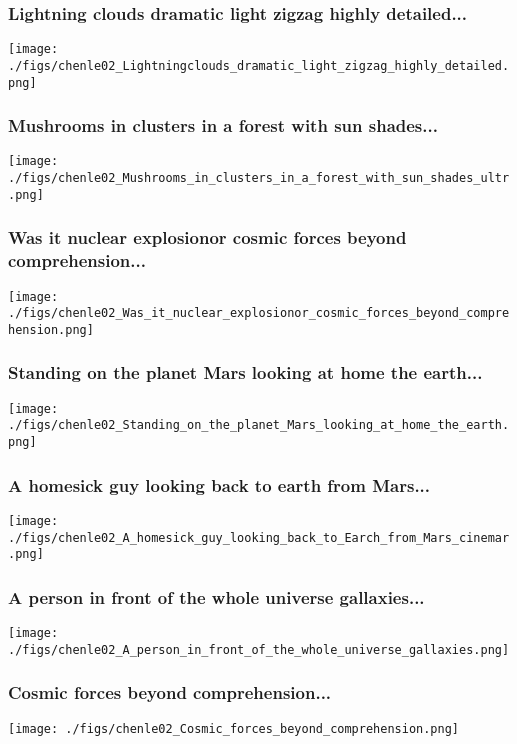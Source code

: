 \documentclass[9pt,xcolor=dvipsnames,table]{beamer}
\begin{document}
\begin{frame}[fragile,t] %
  \frametitle{Lightning clouds dramatic light zigzag highly detailed...}
  \begin{center}
    \texttt{[image: ./figs/chenle02\_Lightningclouds\_dramatic\_light\_zigzag\_highly\_detailed.png]}
  \end{center}
\end{frame}
\begin{frame}[fragile,t] %
  \frametitle{Mushrooms in clusters in a forest with sun shades...}
  \begin{center}
    \texttt{[image: ./figs/chenle02\_Mushrooms\_in\_clusters\_in\_a\_forest\_with\_sun\_shades\_ultr.png]}
  \end{center}
\end{frame}
\begin{frame}[fragile,t] %
  \frametitle{Was it nuclear explosionor cosmic forces beyond comprehension...}
  \begin{center}
    \texttt{[image: ./figs/chenle02\_Was\_it\_nuclear\_explosionor\_cosmic\_forces\_beyond\_comprehension.png]}
  \end{center}
\end{frame}
\begin{frame}[fragile,t] %
  \frametitle{Standing on the planet Mars looking at home the earth...}
  \begin{center}
    \texttt{[image: ./figs/chenle02\_Standing\_on\_the\_planet\_Mars\_looking\_at\_home\_the\_earth.png]}
  \end{center}
\end{frame}
\begin{frame}[fragile,t] %
  \frametitle{A homesick guy looking back to earth from Mars...}
  \begin{center}
    \texttt{[image: ./figs/chenle02\_A\_homesick\_guy\_looking\_back\_to\_Earch\_from\_Mars\_cinemar.png]}
  \end{center}
\end{frame}
\begin{frame}[fragile,t] %
  \frametitle{A person in front of the whole universe gallaxies...}
  \begin{center}
    \texttt{[image: ./figs/chenle02\_A\_person\_in\_front\_of\_the\_whole\_universe\_gallaxies.png]}
  \end{center}
\end{frame}
\begin{frame}[fragile,t] %
  \frametitle{Cosmic forces beyond comprehension...}
  \begin{center}
    \texttt{[image: ./figs/chenle02\_Cosmic\_forces\_beyond\_comprehension.png]}
  \end{center}
\end{frame}
\end{document}
